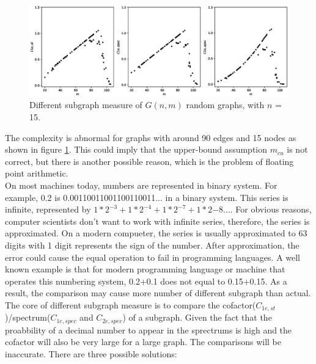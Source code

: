 \documentclass[12pt]{article}
\begin{document}
\begin{figure}[ht]
    \includegraphics[width=\textwidth]{subgraph_measures.eps}
    \caption{Different subgraph measure of $G(n,m)$ random graphs, with $n$ = 15.}
    \label{fig:subgraph_measure}
\end{figure}
\noindent
The complexity is abnormal for graphs with around 90 edges and 15 nodes as shown in figure \ref{fig:subgraph_measure}. This could imply that the upper-bound assumption $m_{cu}$ is not correct, but there is another possible reason, which is the problem of floating point arithmetic.\\
On most machines today, numbers are represented in binary system\cite{floating_point}. For example, 0.2 is 0.00110011001100110011... in a binary system. This series is infinite, represented by $1*2^{-3}+1*2^{-4}+1*2^{-7}+1*2{-8}...$. For obvious reasons, computer scientists don't want to work with infinite series, therefore, the series is approximated. On a modern compueter, the series is usually approximated to 63 digits with 1 digit represents the sign of the number. After approximation, the error could cause the equal operation to fail in programming languages. A well known example is that for modern programming language or machine that operates this numbering system, 0.2+0.1 does not equal to 0.15+0.15. As a result, the comparison may cause more number of different subgraph than actual.\\
The core of different subgraph measure is to compare the cofactor($C_{1e,st}$)/spectrum($C_{1e,spec}$ and $C_{2e,spec}$) of a subgraph. Given the fact that the proabbility of a decimal number to appear in the sprectrums is high and the cofactor will also be very large for a large graph. The comparisons will be inaccurate. There are three possible solutions:
\end{document}
